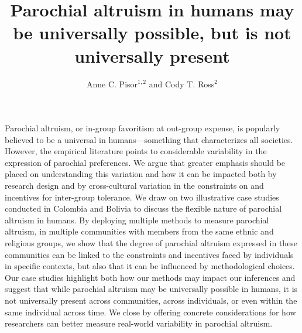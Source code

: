 \documentclass[bibauthoryear]{aa}
\begin{document}
 


   \title{Parochial altruism in humans may be universally possible, but is not universally present}

\author{%
Anne C. Pisor$^{1,2}$ and Cody T. Ross$^{2}$
}

   \date{}

 
  \abstract
 {
Parochial altruism, or in-group favoritism at out-group expense, is popularly believed to be a universal in humans---something that characterizes all societies. However, the empirical literature points to considerable variability in the expression of parochial preferences. We argue that greater emphasis should be placed on understanding this variation and how it can be impacted both by research design and by cross-cultural variation in the constraints on and incentives for inter-group tolerance. We draw on two illustrative case studies conducted in Colombia and Bolivia to discuss the flexible nature of parochial altruism in humans. By deploying multiple methods to measure parochial altruism, in multiple communities with members from the same ethnic and religious groups, we show that the degree of parochial altruism expressed in these communities can be linked to the constraints and incentives faced by individuals in specific contexts, but also that it can be influenced by methodological choices. Our case studies  highlight both how our methods may impact our inferences and suggest that while parochial altruism may be universally possible in humans, it is not universally present across communities, across individuals, or even within the same individual across time. We close by offering concrete considerations for how researchers can better measure real-world variability in parochial altruism.
 }

               
               \titlerunning{~}
\authorrunning{~  }%

   \maketitle
%
\end{document}
